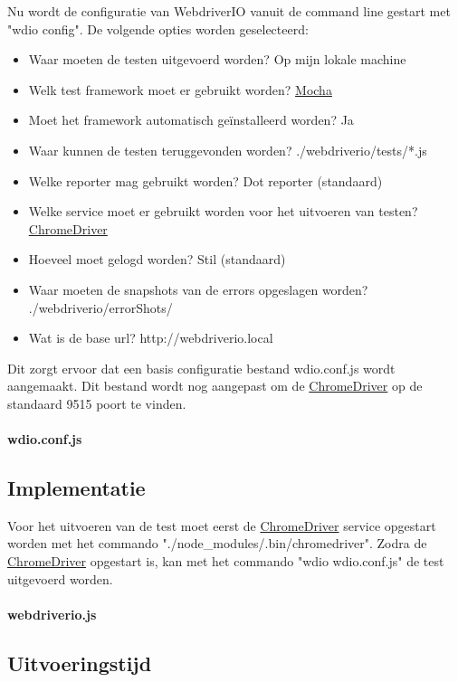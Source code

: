 Nu wordt de configuratie van WebdriverIO vanuit de command line gestart met "wdio config". De volgende opties worden geselecteerd:
\begin{itemize}
\item Waar moeten de testen uitgevoerd worden? Op mijn lokale machine
\item Welk test \gls{framework} moet er gebruikt worden? \hyperref[mocha]{Mocha}
\item Moet het \gls{framework} automatisch geïnstalleerd worden? Ja
\item Waar kunnen de testen teruggevonden worden? ./webdriverio/tests/*.js
\item Welke reporter mag gebruikt worden? Dot reporter (standaard)
\item Welke service moet er gebruikt worden voor het uitvoeren van testen? \hyperref[chromedriver]{ChromeDriver}
\item Hoeveel moet gelogd worden? Stil (standaard)
\item Waar moeten de \glspl{snapshot} van de errors opgeslagen worden? ./webdriverio/errorShots/
\item Wat is de base url? http://webdriverio.local
\end{itemize}
Dit zorgt ervoor dat een basis configuratie bestand wdio.conf.js wordt aangemaakt. Dit bestand wordt nog aangepast om de \hyperref[chromedriver]{ChromeDriver} op de standaard 9515 poort te vinden.

\clearpage
\paragraph{wdio.conf.js}

\subsection{Implementatie}
Voor het uitvoeren van de test moet eerst de \hyperref[chromedriver]{ChromeDriver} service opgestart worden met het commando "./node\_modules/.bin/chromedriver". Zodra de \hyperref[chromedriver]{ChromeDriver} opgestart is, kan met het commando "wdio wdio.conf.js" de test uitgevoerd worden.
\clearpage
\paragraph{webdriverio.js}


\subsection{Uitvoeringstijd}


